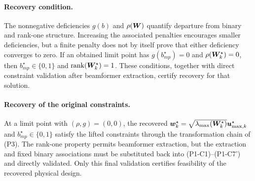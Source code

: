 \paragraph{Recovery condition.} The nonnegative deficiencies $g(b)$ and $\rho(\bm{W})$ quantify departure from binary and rank-one structure. Increasing the associated penalties encourages smaller deficiencies, but a finite penalty does not by itself prove that either deficiency converges to zero. If an obtained limit point has $g(b_{mp}^\star)=0$ and $\rho(\bm{W}_k^\star)=0$, then $b_{mp}^\star\in\{0,1\}$ and $\operatorname{rank}(\bm{W}_k^\star)=1$. These conditions, together with direct constraint validation after beamformer extraction, certify recovery for that solution.

\paragraph{Recovery of the original constraints.} At a limit point with $(\rho,g)=(0,0)$, the recovered $\bm{w}_k^\star=\sqrt{\lambda_{\max}(\bm{W}_k^\star)}\bm{u}_{\max,k}^\star$ and $b_{mp}^\star\in\{0,1\}$ satisfy the lifted constraints through the transformation chain of (P3). The rank-one property permits beamformer extraction, but the extraction and fixed binary associations must be substituted back into (P1-C1)--(P1-C7') and directly validated. Only this final validation certifies feasibility of the recovered physical design.
